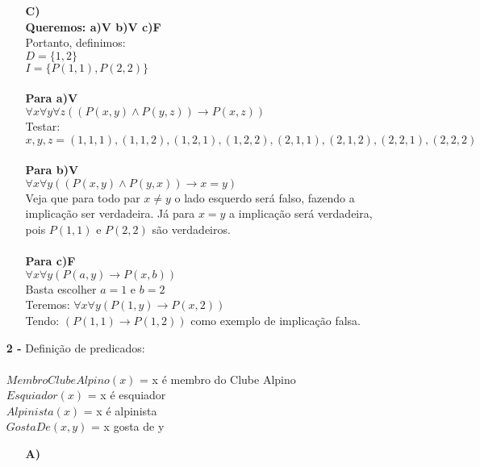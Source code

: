 \documentclass[12pt]{article}
\begin{document}
\begin{itemize}
\begin{itemize}
						
					\item[\textbf{C)}]
						\hfill\\
						\textbf{Queremos: a)V b)V c)F}\\
						Portanto, definimos:\\
						$D = \lbrace 1, 2 \rbrace$\\
						$I = \lbrace P(1, 1), P(2, 2) \rbrace$\\ \\
						\textbf{Para a)V}\\
						$\forall x \forall y \forall z ((P(x,y) \wedge P(y,z)) \rightarrow P(x, z))$\\
						Testar:\\
						$x, y, z = (1, 1, 1) , (1, 1, 2), (1, 2, 1), (1, 2, 2), (2, 1, 1),
						(2, 1, 2), (2, 2, 1), (2, 2, 2)$\\
						\\
						\textbf{Para b)V}\\
						$\forall x \forall y ((P(x,y) \wedge P(y,x)) \rightarrow x = y)$\\
						Veja que para todo par $x \neq y$ o lado esquerdo será falso, fazendo
						a implicação ser verdadeira. Já para $x = y$ a implicação será verdadeira,
						pois $P(1, 1)$ e $P(2, 2)$ são verdadeiros.\\
						\\
						\textbf{Para c)F}\\
						$\forall x \forall y (P(a,y) \rightarrow P(x, b))$\\
						Basta escolher $a = 1$ e $b = 2$\\
						Teremos: $\forall x \forall y (P(1,y) \rightarrow P(x, 2))$\\
						Tendo: $(P(1,1) \rightarrow P(1, 2))$ como exemplo de implicação falsa. 
			\end{itemize}
		\newpage
		\item[\textbf{2 -}]
			\hfill\newline
			Definição de predicados:\\ \\
			$MembroClubeAlpino(x)$ = x é membro do Clube Alpino\\
			$Esquiador(x)$ = x é esquiador\\
			$Alpinista(x)$ = x é alpinista\\
			$GostaDe(x, y)$ = x gosta de y\\
			\begin{itemize}
				\item[\textbf{A) }]
					\hfill\newline

\end{itemize}
\end{itemize}
\end{document}
